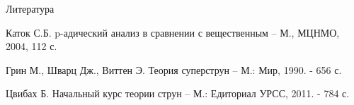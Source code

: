 \documentclass[newPxFont,sthlmFooter]{beamer}
\begin{document}
\begin{frame}{Литература}
	\begin{thebibliography}{10}

	\beamertemplatebookbibitems
	 Каток С.Б. p-адический анализ в сравнении с вещественным -- М., МЦНМО, 2004, 112 с. 

	\beamertemplatebookbibitems
	Грин М., Шварц Дж., Виттен Э. Теория суперструн -- М.: Мир, 1990. - 656 с. 

	\beamertemplatebookbibitems
	Цвибах Б. Начальный курс теории струн -- М.: Едиториал УРСС, 2011. - 784 с.	

  \end{thebibliography}
\end{frame}
\end{document}

